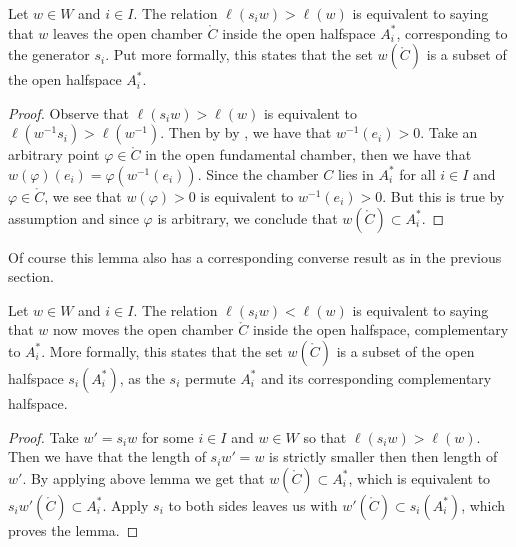 \begin{lemma}\label{lem:translation}
    Let \(w\in W\) and \(i\in I\).
    The relation \(\ell(s_i w) > \ell(w)\) is equivalent to saying that \(w\) leaves the open chamber \(\mathring{C}\) inside the open halfspace \(A_i^*\), corresponding to the generator \(s_i\).
    Put more formally, this states that the set \(w(\mathring{C})\) is a subset of the open halfspace \(A_i^*\).
\end{lemma}
\begin{proof}
    Observe that \(\ell(s_iw) > \ell(w)\) is equivalent to \(\ell(w^{-1}s_i) > \ell(w^{-1})\).
    Then by by , we have that \(w^{-1}(e_i) > 0\).
    Take an arbitrary point \(\varphi\in \mathring{C}\) in the open fundamental chamber, then we have that \(w(\varphi)(e_i) = \varphi(w^{-1}(e_i))\).
    Since the chamber \(C\) lies in \(A_i^*\) for all \(i\in I\) and \(\varphi \in \mathring{C}\), we see that \(w(\varphi) > 0\) is equivalent to \(w^{-1}(e_i)>0\).
    But this is true by assumption and since \(\varphi\) is arbitrary, we conclude that \(w(\mathring{C}) \subset A_i^*\).
\end{proof}

Of course this lemma also has a corresponding converse result as in the previous section.

\begin{lemma}\label{lem:translation2}
    Let \(w\in W\) and \(i\in I\).
    The relation \(\ell(s_i w) < \ell(w)\) is equivalent to saying that \(w\) now moves the open chamber \(\mathring{C}\) inside the open halfspace, complementary to \(A_i^*\).
    More formally, this states that the set \(w(\mathring{C})\) is a subset of the open halfspace \(s_i(A_i^*)\), as the \(s_i\) permute \(A_i^*\) and its corresponding complementary halfspace.
\end{lemma}
\begin{proof}
    Take \(w' = s_i w\) for some \(i \in I\) and \(w \in W\) so that \(\ell(s_i w) > \ell(w)\).
    Then we have that the length of \(s_i w' = w\) is strictly smaller then then length of \(w'\).
    By applying above lemma we get that \(w(\mathring{C}) \subset A_i^*\), which is equivalent to \(s_i w'(\mathring{C}) \subset A_i^*\).
    Apply \(s_i\) to both sides leaves us with \(w'(\mathring{C}) \subset s_i(A_i^*)\), which proves the lemma.
\end{proof}

